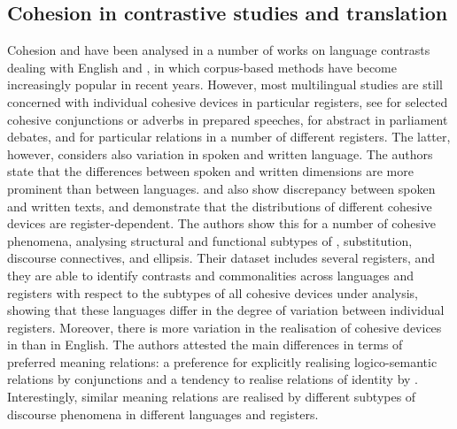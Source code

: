 \documentclass[output=paper]{langsci/langscibook.cls}
\begin{document}
\subsection{Cohesion in contrastive studies and translation}\label{sec:discourseEnDe}
Cohesion and  have been analysed in a number of works on language contrasts dealing with English and , in which corpus-based methods have become increasingly popular in recent years. However, most multilingual studies are still concerned with individual cohesive devices in particular registers, see \citet{BuehrigHouse2004}
for selected cohesive conjunctions or adverbs in prepared speeches, \citet{ZinsmeisterEtAl2012} for abstract  in parliament debates, and \citet{TaboadaGomezGonzalez2012} for particular  relations in a number of different registers. The latter, however, considers also variation in spoken and written language. The authors state that the differences between spoken and written dimensions are more prominent than between languages. \citet{KunzLapshinova2015} and \citet{SleGeccoForthcoming} also show discrepancy between spoken and written texts, and demonstrate that the distributions of different cohesive devices are register-dependent. The authors show this for a number of cohesive phenomena, analysing structural and functional subtypes of , substitution, discourse connectives, and ellipsis. Their dataset includes several registers, and they are able to identify contrasts and commonalities across languages and registers with respect to the subtypes of all cohesive devices under analysis, showing that these languages differ in the degree of variation between individual registers. Moreover, there is more variation in the realisation of cohesive devices in  than in English. The authors attested the main differences in terms of preferred meaning relations: a preference for explicitly realising logico-semantic relations by conjunctions and a tendency to realise relations of identity by . Interestingly, similar meaning relations are realised by different subtypes of discourse phenomena in different languages and registers.
\end{document}
